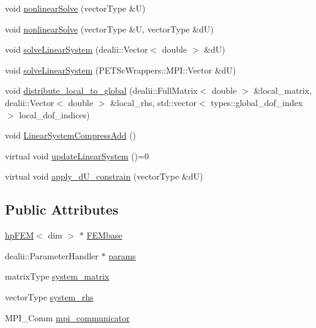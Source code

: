 \begin{DoxyCompactItemize}
\item 
void \mbox{\hyperlink{classsolve_class_aa848c866771bf63f69e8ff35d4c947aa}{nonlinear\+Solve}} (vector\+Type \&U)
\item 
void \mbox{\hyperlink{classsolve_class_a9240f8777a918e2c20e57857e4b6b97e}{nonlinear\+Solve}} (vector\+Type \&U, vector\+Type \&dU)
\item 
void \mbox{\hyperlink{classsolve_class_a922f231ca16d84f2d3253c0d497f2448}{solve\+Linear\+System}} (dealii\+::\+Vector$<$ double $>$ \&dU)
\item 
void \mbox{\hyperlink{classsolve_class_a31c22340527a596f8d6aeeea60ffe52a}{solve\+Linear\+System}} (P\+E\+T\+Sc\+Wrappers\+::\+M\+P\+I\+::\+Vector \&dU)
\item 
void \mbox{\hyperlink{classsolve_class_af9e8a3e1a38280c43f242bbeb7139f00}{distribute\+\_\+local\+\_\+to\+\_\+global}} (dealii\+::\+Full\+Matrix$<$ double $>$ \&local\+\_\+matrix, dealii\+::\+Vector$<$ double $>$ \&local\+\_\+rhs, std\+::vector$<$ types\+::global\+\_\+dof\+\_\+index $>$ local\+\_\+dof\+\_\+indices)
\item 
void \mbox{\hyperlink{classsolve_class_ad7659997bee5e782a6eaa46db001b66a}{Linear\+System\+Compress\+Add}} ()
\item 
virtual void \mbox{\hyperlink{classsolve_class_ac26f13764de7ae2dceb36ad98428a485}{update\+Linear\+System}} ()=0
\item 
virtual void \mbox{\hyperlink{classsolve_class_a029ece57f667fa697cb29eb482eff31b}{apply\+\_\+d\+U\+\_\+constrain}} (vector\+Type \&dU)
\end{DoxyCompactItemize}
\subsection*{Public Attributes}
\begin{DoxyCompactItemize}
\item 
\mbox{\hyperlink{classhp_f_e_m}{hp\+F\+EM}}$<$ dim $>$ $\ast$ \mbox{\hyperlink{classsolve_class_a46118a342b07ce7167bb0c9358de84f1}{F\+E\+Mbase}}
\item 
dealii\+::\+Parameter\+Handler $\ast$ \mbox{\hyperlink{classsolve_class_accca5aede13ea52f0c11dff4daf1ad97}{params}}
\item 
matrix\+Type \mbox{\hyperlink{classsolve_class_a56f7357eb335f9ce4ac30bc30d7513e8}{system\+\_\+matrix}}
\item 
vector\+Type \mbox{\hyperlink{classsolve_class_a6c39fa839fdc40d2408946617a778571}{system\+\_\+rhs}}
\item 
M\+P\+I\+\_\+\+Comm \mbox{\hyperlink{classsolve_class_a03728ed636ca889ae407c84d181bc611}{mpi\+\_\+communicator}}
\end{DoxyCompactItemize}


